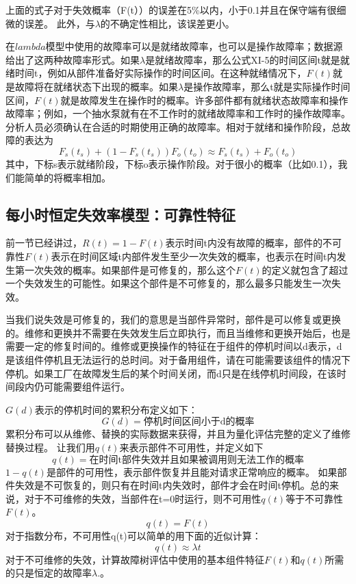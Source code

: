 \documentclass[cn,11pt,chinese]{elegantbook}
\begin{document}
{上面的式子对于失效概率（F(t））的误差在5\%以内，小于0.1并且在保守端有很细微的误差。
此外，与$\lambda$的不确定性相比，该误差更小。

在$lambda$模型中使用的故障率可以是就绪故障率，也可以是操作故障率；数据源给出了这两种故障率形式。如果$\lambda$是就绪故障率，那么公式XI-5的时间区间t就是就绪时间t，例如从部件准备好实际操作的时间区间。在这种就绪情况下，$F(t)$就是故障将在就绪状态下出现的概率。如果$\lambda$是操作故障率，那么t就是实际操作时间区间，$F(t)$就是故障发生在操作时的概率。许多部件都有就绪状态故障率和操作故障率；例如，一个抽水泵就有在不工作时的就绪故障率和工作时的操作故障率。分析人员必须确认在合适的时期使用正确的故障率。相对于就绪和操作阶段，总故障的表达为
$$F_s(t_s)+(1-F_s(t_s))F_o(t_o) \approx F_s(t_s)+F_o(t_o)$$
其中，下标s表示就绪阶段，下标o表示操作阶段。对于很小的概率（比如0.1），我们能简单的将概率相加。

\subsection{每小时恒定失效率模型：可靠性特征}

前一节已经讲过，$R(t)=1-F(t)$表示时间t内没有故障的概率，部件的不可靠性$F(t)$表示在时间区域t内部件发生至少一次失效的概率，也表示在时间t内发生第一次失效的概率。如果部件是可修复的，那么这个$F(t)$的定义就包含了超过一个失效发生的可能性。如果这个部件是不可修复的，那么最多只能发生一次失效。

当我们说失效是可修复的，我们的意思是当部件异常时，部件是可以修复或更换的。维修和更换并不需要在失效发生后立即执行，而且当维修和更换开始后，也是需要一定的修复时间的。维修或更换操作的特征在于组件的停机时间以d表示，d是该组件停机且无法运行的总时间。对于备用组件，请在可能需要该组件的情况下停机。如果工厂在故障发生后的某个时间关闭，而d只是在线停机时间段，在该时间段内仍可能需要组件运行。

$G(d)$表示的停机时间的累积分布定义如下：
$$G(d)=\mbox{停机时间区间小于d的概率}$$
累积分布可以从维修、替换的实际数据来获得，并且为量化评估完整的定义了维修替换过程。
让我们用$q(t)$来表示部件不可用性，并定义如下
$$q(t)=\mbox{在时间t部件失效并且如果被调用则无法工作的概率}$$
$1-q(t)$是部件的可用性，表示部件恢复并且能对请求正常响应的概率。
如果部件失效是不可恢复的，则只有在时间t内失效时，部件才会在时间t停机。总的来说，对于不可维修的失效，当部件在t=0时运行，则不可用性$q(t)$等于不可靠性$F(t)$。
$$q(t)=F(t)$$
对于指数分布，不可用性q(t)可以简单的用下面的近似计算：
$$q(t) \approx \lambda t$$
对于不可维修的失效，计算故障树评估中使用的基本组件特征$F(t)$和$q(t)$所需的只是恒定的故障率$\lambda$.。

}
\end{document}
